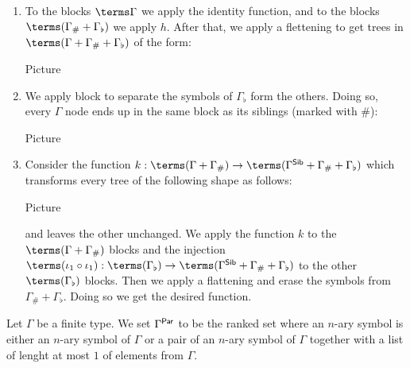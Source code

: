 \begin{example}
\begin{enumerate}
\item To the blocks $\terms \Gamma$ we apply the identity function, and to the blocks $\terms(\Gamma_\#+\Gamma_\flat)$ we apply $h$. After that, we apply a flettening to get trees in $\terms(\Gamma+\Gamma_\#+\Gamma_\flat)$ of the form:
\begin{center}
Picture
\end{center} 
\item We apply block to separate the symbols of $\Gamma_\flat$ form the others. Doing so, every $\Gamma$ node ends up in the same block as its siblings (marked with $\#$):
\begin{center}
Picture
\end{center}
\item Consider the function $k:\terms(\Gamma+\Gamma_\#)\to \terms(\Gamma^{\sf{Sib}}+\Gamma_\#+\Gamma_\flat)$ which transforms every tree of the following shape as follows:
\begin{center}
Picture
\end{center}
and leaves the other unchanged. We apply the function $k$ to the $\terms(\Gamma+\Gamma_\#)$
blocks and the injection $\terms (\iota_1\circ \iota_1):\terms(\Gamma_\flat)\to \terms(\Gamma^{\sf{Sib}}+\Gamma_\#+\Gamma_\flat)$ to the other $\terms(\Gamma_\flat)$ blocks. Then we apply a flattening and erase the symbols from $\Gamma_\#+\Gamma_\flat$. Doing so we get the desired function.
\end{enumerate}
\medskip

Let $\Gamma$ be a finite type. We set $\Gamma^{\sf{Par}}$ to be the ranked set where an $n$-ary symbol is either an $n$-ary symbol of $\Gamma$ or a pair of an $n$-ary symbol of $\Gamma$ together with a list of lenght at most $1$ of elements from $\Gamma$. %


\end{example}
